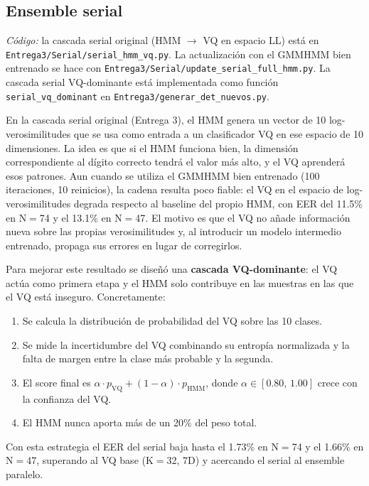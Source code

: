 \documentclass[11pt,a4paper]{article}
\begin{document}
\subsection{Ensemble serial}

\textit{C\'{o}digo:} la cascada serial original (HMM $\to$ VQ en espacio
LL) est\'{a} en \texttt{Entrega3/Serial/serial\_hmm\_vq.py}. La actualizaci\'{o}n
con el GMMHMM bien entrenado se hace con
\texttt{Entrega3/Serial/update\_serial\_full\_hmm.py}. La cascada serial
VQ-dominante est\'{a} implementada como funci\'{o}n
\texttt{serial\_vq\_dominant} en
\texttt{Entrega3/generar\_det\_nuevos.py}.

En la cascada serial original (Entrega 3), el HMM genera un vector de
10 log-verosimilitudes que se usa como entrada a un clasificador VQ en ese
espacio de 10 dimensiones. La idea es que si el HMM funciona bien, la dimensi\'{o}n
correspondiente al d\'{i}gito correcto tendr\'{a} el valor m\'{a}s alto, y el VQ
aprender\'{a} esos patrones. Aun cuando se utiliza el GMMHMM bien entrenado
(100 iteraciones, 10 reinicios), la cadena resulta poco fiable: el VQ en el
espacio de log-verosimilitudes degrada respecto al baseline del propio HMM,
con EER del 11.5\% en N$=$74 y el 13.1\% en N$=$47. El motivo es que el VQ
no a\~{n}ade informaci\'{o}n nueva sobre las propias verosimilitudes y, al
introducir un modelo intermedio entrenado, propaga sus errores en lugar de
corregirlos.

Para mejorar este resultado se dise\~{n}\'{o} una \textbf{cascada VQ-dominante}: el VQ
act\'{u}a como primera etapa y el HMM solo contribuye en las muestras en las que el
VQ est\'{a} inseguro. Concretamente:

\begin{enumerate}
  \item Se calcula la distribuci\'{o}n de probabilidad del VQ sobre las 10 clases.
  \item Se mide la incertidumbre del VQ combinando su entrop\'{i}a normalizada y la
        falta de margen entre la clase m\'{a}s probable y la segunda.
  \item El score final es $\alpha \cdot p_\text{VQ} + (1-\alpha) \cdot p_\text{HMM}$,
        donde $\alpha \in [0.80,\, 1.00]$ crece con la confianza del VQ.
  \item El HMM nunca aporta m\'{a}s de un 20\% del peso total.
\end{enumerate}

Con esta estrategia el EER del serial baja hasta el 1.73\% en N$=$74 y el 1.66\%
en N$=$47, superando al VQ base (K$=$32, 7D) y acercando el serial al ensemble
paralelo.
\end{document}

